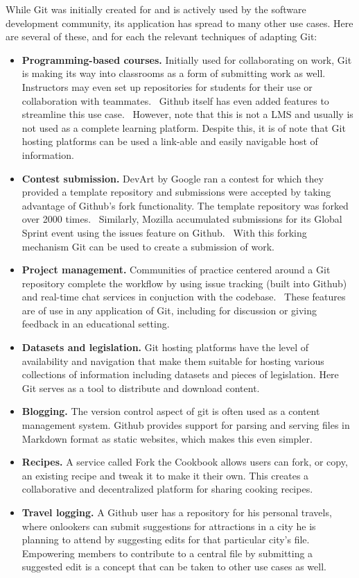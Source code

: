 \documentclass[12pt,twoside]{mitthesis}
\newcommand{\draft}[1]{{\color{blue} #1}}
\begin{document}
\draft{
While Git was initially created for and is actively used by the software development community, its application has spread to many other use cases. Here are several of these, and for each the relevant techniques of adapting Git:
\begin{itemize}
\item \textbf{Programming-based courses.} Initially used for collaborating on work, Git is making its way into classrooms as a form of submitting work as well. Instructors may even set up repositories for students for their use or collaboration with teammates.~\cite{whygithubclassroom} Github itself has even added features to streamline this use case.~\cite{githubclassroom} However, note that this is not a LMS and usually is not used as a complete learning platform. Despite this, it is of note that Git hosting platforms can be used a link-able and easily navigable host of information.
\item \textbf{Contest submission.} DevArt by Google ran a contest for which they provided a template repository and submissions were accepted by taking advantage of Github's fork functionality. The template repository was forked over 2000 times.~\cite{devart} Similarly, Mozilla accumulated submissions for its Global Sprint event using the issues feature on Github.~\cite{globalsprint} With this forking mechanism Git can be used to create a submission of work.
\item \textbf{Project management.} Communities of practice centered around a Git repository complete the workflow by using issue tracking (built into Github) and real-time chat services in conjuction with the codebase.~\cite{githubpm} These features are of use in any application of Git, including for discussion or giving feedback in an educational setting.
\item \textbf{Datasets and legislation.} Git hosting platforms have the level of availability and navigation that make them suitable for hosting various collections of information including datasets and pieces of legislation. Here Git serves as a tool to distribute and download content.~\cite{sevenwaysgit}
\item \textbf{Blogging.} The version control aspect of git is often used as a content management system. Github provides support for parsing and serving files in Markdown format as static websites, which makes this even simpler.~\cite{whygithubclassroom}
\item \textbf{Recipes.} A service called Fork the Cookbook allows users can fork, or copy, an existing recipe and tweak it to make it their own. This creates a collaborative and decentralized platform for sharing cooking recipes.~\cite{forkthecookbook}
\item \textbf{Travel logging.} A Github user has a repository for his personal travels, where onlookers can submit suggestions for attractions in a city he is planning to attend by suggesting edits for that particular city's file.~\cite{travellog} Empowering members to contribute to a central file by submitting a suggested edit is a concept that can be taken to other use cases as well.
\end{itemize}
}
\end{document}
